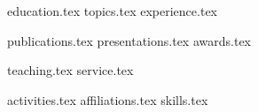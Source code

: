 \documentclass[letterpaper,11pt]{article}
\begin{document}


{education.tex}
{topics.tex}
{experience.tex}


\pagebreak
{publications.tex}
{presentations.tex}
{awards.tex}


{teaching.tex}
{service.tex}


{activities.tex}
{affiliations.tex}
{skills.tex}


\pagebreak
\end{document}
